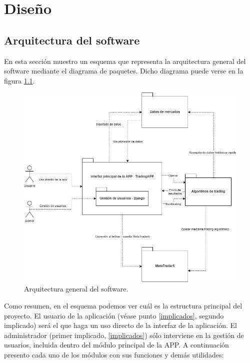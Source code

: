 
\chapter{Diseño}


\section{Arquitectura del software}

En esta sección muestro un esquema que representa la arquitectura general del software mediante el diagrama de paquetes. Dicho diagrama puede verse en la figura \ref{paquetes}.\newline


\begin{figure}[h]
	\includegraphics[width=1.1\textwidth]{imagenes/arquitectura general.png}
	\caption{Arquitectura general del software.} \label{paquetes}
\end{figure}


Como resumen, en el esquema podemos ver cuál es la estructura principal del proyecto. El usuario de la aplicación (véase punto \ref{implicados}, segundo implicado) será el que haga un uso directo de la interfaz de la aplicación. El administrador (primer implicado, \ref{implicados}) sólo interviene en la gestión de usuarios, incluida dentro del módulo principal de la APP. A continuación presento cada uno de los módulos con sus funciones y demás utilidades:

